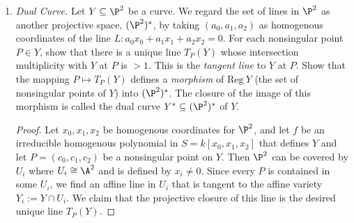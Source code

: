 \documentclass[a4paper]{article}
\begin{document}
\begin{enumerate} [label=\textbf{\arabic*.}, leftmargin=0cm]
  \item[\textbf{3.}] \textit{Dual Curve.} Let $Y \subseteq \P^2$ be a curve. We regard the set of lines in $\P^2$ as another projective space, $(\P^2)^*$, by taking $(a_0, a_1, a_2)$ as homogenous coordinates of the line $L : a_0 x_0 + a_1 x_1 + a_2 x_2 = 0$.
  For each nonsingular point $P \in Y$, show that there is a unique line $T_P(Y)$ whose intersection multiplicity with $Y$ at $P$ is $ > 1$. This is the \textit{tangent line} to $Y$ at $P$.
  Show that the mapping $P \mapsto T_P(Y)$ defines a \textit{morphism} of $\text{Reg}~Y$ (the set of nonsingular points of $Y$) into $(\P^2)^*$. The closure of the image of this morphism is called the dual curve $Y^* \subseteq (\P^2)^*$ of $Y$.

        \begin{proof}
          Let $x_0, x_1, x_2$ be homogenous coordinates for $\P^2$, and let $f$ be an irreducible homogenous polynomial in $S = k[x_0, x_1, x_2]$ that defines $Y$ and let $P = (c_0, c_1, c_2)$ be a nonsingular point on $Y$.
          Then $\P^2$ can be covered by $U_i$ where $U_i \cong \A^2$ and is defined by $x_i \neq 0$. Since every $P$ is contained in some $U_i$, we find an affine line in $U_i$ that is tangent to the affine variety $Y_i := Y \cap U_i$.
          We claim that the projective closure of this line is the desired unique line $T_P(Y)$.


\end{proof}
\end{enumerate}
\end{document}
